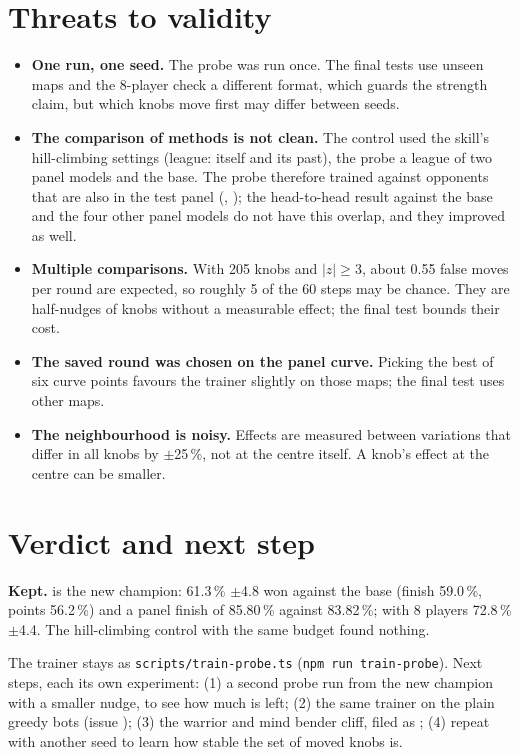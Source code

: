 \documentclass{../polyexp}
\begin{document}
\section{Threats to validity}
\begin{itemize}
\item \textbf{One run, one seed.} The probe was run once. The final tests use unseen maps and the 8-player check a different format, which guards the strength claim, but which knobs move first may differ between seeds.
\item \textbf{The comparison of methods is not clean.} The control used the skill's hill-climbing settings (league: itself and its past), the probe a league of two panel models and the base. The probe therefore trained against opponents that are also in the test panel (, ); the head-to-head result against the base and the four other panel models do not have this overlap, and they improved as well.
\item \textbf{Multiple comparisons.} With 205 knobs and $|z|\ge 3$, about 0.55 false moves per round are expected, so roughly 5 of the 60 steps may be chance. They are half-nudges of knobs without a measurable effect; the final test bounds their cost.
\item \textbf{The saved round was chosen on the panel curve.} Picking the best of six curve points favours the trainer slightly on those maps; the final test uses other maps.
\item \textbf{The neighbourhood is noisy.} Effects are measured between variations that differ in all knobs by $\pm$25\,\%, not at the centre itself. A knob's effect at the centre can be smaller.
\end{itemize}

\section{Verdict and next step}
\textbf{Kept.}  is the new champion: 61.3\,\% $\pm$4.8 won against the base (finish 59.0\,\%, points 56.2\,\%) and a panel finish of 85.80\,\% against 83.82\,\%; with 8 players 72.8\,\% $\pm$4.4. The hill-climbing control with the same budget found nothing.

The trainer stays as \texttt{scripts/train-probe.ts} (\texttt{npm run train-probe}). Next steps, each its own experiment: (1) a second probe run from the new champion with a smaller nudge, to see how much is left; (2) the same trainer on the plain greedy bots (issue ); (3) the warrior and mind bender cliff, filed as ; (4) repeat with another seed to learn how stable the set of moved knobs is.
\end{document}
